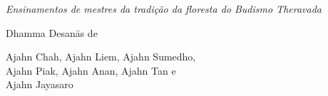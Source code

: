 
\cleartorecto
\thispagestyle{empty}
\vspace*{5em}

{\centering

{\Large\chapterTitleFont\scshape\MakeLowercase{\thetitle}}
\medskip

{\itshape
Ensinamentos de mestres da tradição
da floresta do Budismo Theravada}

\bigskip

Dhamma Desanās de

Ajahn Chah, Ajahn Liem, Ajahn Sumedho,\\
Ajahn Piak, Ajahn Anan, Ajahn Tan e\\
Ajahn Jayasaro

}


